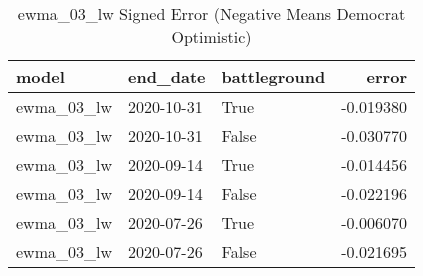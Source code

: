 \begin{table}
\centering
\caption{ewma_03_lw Signed Error
(Negative Means Democrat Optimistic)}
\begin{tabular}{lllr}
\toprule
      model &    end\_date &  battleground &     error \\
\midrule
 ewma\_03\_lw &  2020-10-31 &          True & -0.019380 \\
 ewma\_03\_lw &  2020-10-31 &         False & -0.030770 \\
 ewma\_03\_lw &  2020-09-14 &          True & -0.014456 \\
 ewma\_03\_lw &  2020-09-14 &         False & -0.022196 \\
 ewma\_03\_lw &  2020-07-26 &          True & -0.006070 \\
 ewma\_03\_lw &  2020-07-26 &         False & -0.021695 \\
\bottomrule
\end{tabular}
\end{table}
